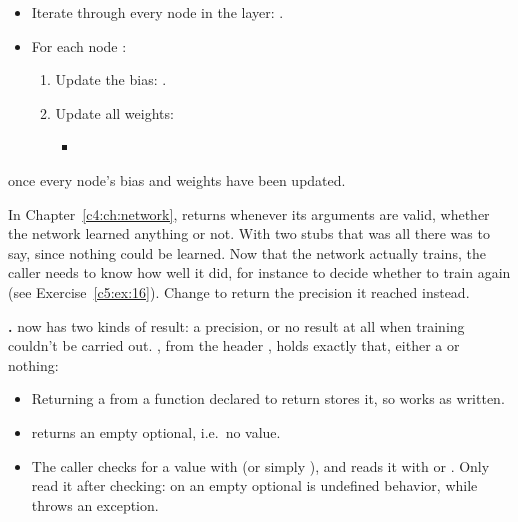 \begin{itemize}
  \item Iterate through every node in the layer:
    .
  \item For each node :
  \begin{enumerate}
    \item Update the bias: .
    \item Update all weights: 
    \begin{itemize}
      \item {}
    \end{itemize}
  \end{enumerate}
\end{itemize}

 once every node's bias and weights have been updated.

\label{c5:ex:15}
In Chapter~\ref{c4:ch:network},  returns  whenever its arguments
are valid, whether the network learned anything or not. With two stubs that was all there was to
say, since nothing could be learned. Now that the network actually trains, the caller needs to know
how well it did, for instance to decide whether to train again (see Exercise~\ref{c5:ex:16}).
Change  to return the precision it reached instead.

\textbf{.}  now has two kinds of result: a precision, or no
result at all when training couldn't be carried out. , from the header
, holds exactly that, either a  or nothing:
\begin{itemize}
  \item Returning a  from a function declared to return
     stores it, so  works as written.
  \item {} returns an empty optional, i.e.\ no value.
  \item The caller checks for a value with  (or simply ),
    and reads it with  or . Only read it after checking:
     on an empty optional is undefined behavior, while  throws an
    exception.
\end{itemize}

